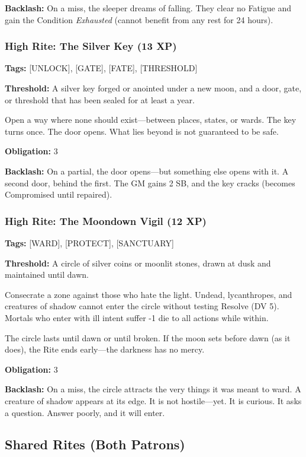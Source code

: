 \textbf{Backlash:} On a miss, the sleeper dreams of falling. They clear no Fatigue and gain the Condition \textit{Exhausted} (cannot benefit from any rest for 24 hours).

\subsubsection{High Rite: The Silver Key (13 XP)}

\textbf{Tags:} [UNLOCK], [GATE], [FATE], [THRESHOLD]

\textbf{Threshold:} A silver key forged or anointed under a new moon, and a door, gate, or threshold that has been sealed for at least a year.

Open a way where none should exist—between places, states, or wards. The key turns once. The door opens. What lies beyond is not guaranteed to be safe.

\textbf{Obligation:} 3

\textbf{Backlash:} On a partial, the door opens—but something else opens with it. A second door, behind the first. The GM gains 2 SB, and the key cracks (becomes Compromised until repaired).

\subsubsection{High Rite: The Moondown Vigil (12 XP)}

\textbf{Tags:} [WARD], [PROTECT], [SANCTUARY]

\textbf{Threshold:} A circle of silver coins or moonlit stones, drawn at dusk and maintained until dawn.

Consecrate a zone against those who hate the light. Undead, lycanthropes, and creatures of shadow cannot enter the circle without testing Resolve (DV 5). Mortals who enter with ill intent suffer -1 die to all actions while within.

The circle lasts until dawn or until broken. If the moon sets before dawn (as it does), the Rite ends early—the darkness has no mercy.

\textbf{Obligation:} 3

\textbf{Backlash:} On a miss, the circle attracts the very things it was meant to ward. A creature of shadow appears at its edge. It is not hostile—yet. It is curious. It asks a question. Answer poorly, and it will enter.

\subsection{Shared Rites (Both Patrons)}

